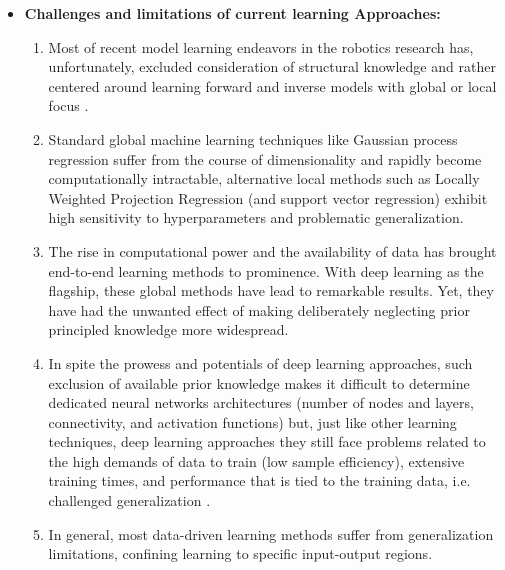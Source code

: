 \documentclass[12pt, a4paper]{article}
\begin{document}
\begin{itemize}
			

	\item \textbf{Challenges and limitations of current learning Approaches:}
	\begin{enumerate}
		\item Most of recent model learning endeavors in the robotics research has, unfortunately, excluded consideration of structural knowledge and rather centered around learning forward and inverse models with global or local focus \cite{NguyenTuong2011Modellearningrobot}.
		\item Standard global machine learning techniques like Gaussian process regression suffer from the course of dimensionality and rapidly become computationally intractable, alternative local methods such as Locally Weighted Projection Regression (and support vector regression) exhibit high sensitivity to hyperparameters and problematic generalization.
		\item The rise in computational power and the availability of data has brought end-to-end learning methods to prominence. With deep learning as the flagship, these global methods have lead to remarkable results. Yet, they have had the unwanted effect of making deliberately neglecting prior principled knowledge more widespread.
		\item In spite the prowess and potentials of deep learning approaches, such exclusion of available prior knowledge makes it difficult to determine dedicated neural networks architectures (number of nodes and layers, connectivity, and activation functions) \cite{Baker2017Designingneuralnetwork,Elsken2019Neuralarchitecturesearch} but, just like other learning techniques, deep learning approaches they still face problems related to the high demands of data to train (low sample efficiency), extensive training times, and performance that is tied to the training data, i.e. challenged generalization \cite{Pierson2017Deeplearningrobotics,Suenderhauf2018limitspotentialsdeep}.
		\item In general, most data-driven learning methods suffer from generalization limitations, confining learning to specific input-output regions.
		
	\end{enumerate}	
	

\end{itemize}
\end{document}
